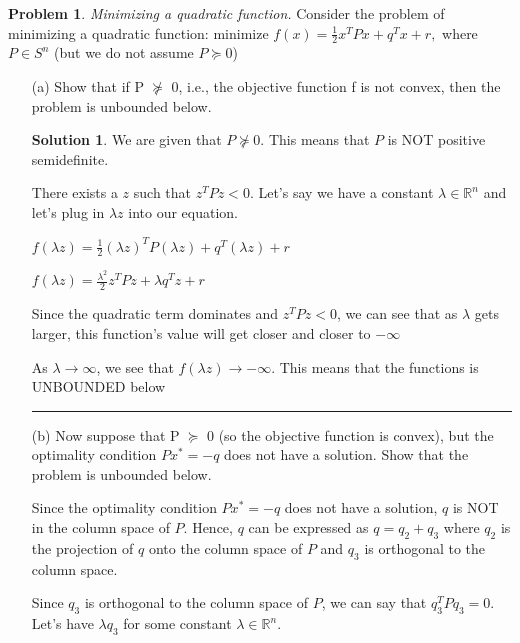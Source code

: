 \documentclass{article}
\theoremstyle{definition}
\newtheorem{problem}{Problem}
\def\fline{\rule{0.75\linewidth}{0.5pt}}
\newcommand{\finishline}{\begin{center}\fline\end{center}}
\newtheorem*{solution*}{Solution}
\newenvironment{solution}{\begin{solution*}}{{\finishline} \end{solution*}}
\begin{document}
\begin{problem}
\textit{Minimizing a quadratic function.} Consider the problem of minimizing a quadratic function: \newline 
minimize $f(x) = \frac{1}{2} x^TPx + q^Tx + r,$ \newline 
where $P \in S^n$ (but we do not assume $P \succcurlyeq 0$)

\begin{enumerate}
    \item[(a)] Show that if P $\not\succcurlyeq$ 0, i.e., the objective function f is not convex, then the problem is unbounded below.

    \begin{solution}
        We are given that $P \not\succcurlyeq 0$. This means that $P$ is NOT positive semidefinite. \newline 

        There exists a $z$ such that $z^TPz < 0$. Let's say we have a constant $\lambda \in \mathbb{R}^n$ and let's plug in $\lambda z$ into our equation. 

        $f(\lambda z) = \frac{1}{2} (\lambda z)^TP(\lambda z) + q^T(\lambda z) + r$
        
        $f(\lambda z) = \frac{\lambda^2}{2} z^TPz + \lambda q^Tz + r$ \newline

        Since the quadratic term dominates and  $z^TPz < 0$, we can see that as $\lambda$ gets larger, this function's value will get closer and closer to $-\infty$

        As $\lambda \rightarrow \infty$, we see that $f(\lambda z) \rightarrow -\infty$. This means that the functions is UNBOUNDED below 

    \end{solution}

    \item[(b)] Now suppose that P $\succcurlyeq$ 0 (so the objective function is convex), but the optimality condition $Px^* = -q$ does not have a solution. Show that the problem is unbounded below. \newline 

    Since the optimality condition $Px^* = -q$ does not have a solution, $q$ is NOT in the column space of $P$. Hence, $q$ can be expressed as $q = q_2 + q_3$ where $q_2$ is the projection of $q$ onto the column space of $P$ and $q_3$ is orthogonal to the column space. \newline 


    Since $q_3$ is orthogonal to the column space of $P$, we can say that $q_3^TPq_3 = 0$. Let's have $\lambda q_3$ for some constant $\lambda \in \mathbb{R}^n$. 


\end{enumerate}
\end{problem}
\end{document}
